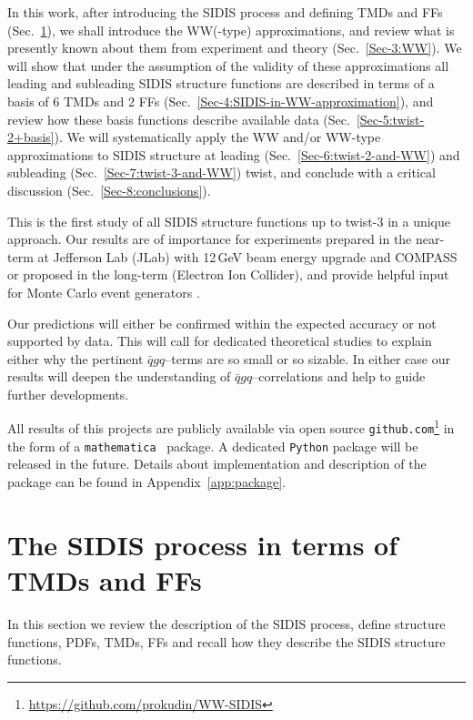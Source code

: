 \documentclass[a4paper,11pt]{article}
\newcommand{\blue}[1]{{\color{blue} #1}}
\newcommand{\ps}[1]{\blue{ #1}}
\begin{document}
In this work, after introducing the SIDIS process and defining TMDs and FFs 
(Sec.~\ref{Sec-2:SIDIS+TMDs+FF}), we shall introduce the WW(-type) 
approximations, and review what is presently known about them 
from experiment and theory (Sec.~\ref{Sec-3:WW}).
We will show that under the assumption of the validity of these approximations 
all leading and subleading SIDIS structure functions are described in terms of 
a basis of 6 TMDs and 2 FFs (Sec.~\ref{Sec-4:SIDIS-in-WW-approximation}),
and review how these basis functions describe available data 
(Sec.~\ref{Sec-5:twist-2+basis}).
We will systematically apply the WW and/or WW-type approximations
to SIDIS structure at leading (Sec.~\ref{Sec-6:twist-2-and-WW}) 
and subleading (Sec.~\ref{Sec-7:twist-3-and-WW}) twist, and
conclude with a critical discussion (Sec.~\ref{Sec-8:conclusions}).

This is the first study of all SIDIS structure functions up to twist-3 
in a unique approach. Our results are of importance for experiments prepared 
in the near-term at \ps{Jefferson Lab (JLab) with 12$\,$GeV beam energy
upgrade and COMPASS} or proposed in the long-term  
(Electron Ion Collider), and provide helpful input for Monte Carlo event
generators \cite{Avakian:2015vha}.

Our predictions will either be confirmed within the expected accuracy
\ps{or not supported by data. This will call for dedicated theoretical 
studies to explain either why the pertinent $\bar{q}gq$--terms are 
so small or so sizable. In either case our results will deepen the 
understanding of  $\bar{q}gq$--correlations and help to guide 
further developments.}

All results of this projects are publicly available via open source \texttt{github.com}\footnote{\href{https://github.com/prokudin/WW-SIDIS}{https://github.com/prokudin/WW-SIDIS}} in the form of a \texttt{mathematica}~\cite{Mathematica} package. A dedicated \texttt{Python} package will be released in the future. Details about implementation and description of the package can be found in Appendix~\ref{app:package}.

\newpage
\section{The SIDIS process in terms of TMDs and FFs}
\label{Sec-2:SIDIS+TMDs+FF}

In this section we review the description of the SIDIS process, 
define structure functions, PDFs, TMDs, FFs and recall how they
describe the SIDIS structure functions.
\end{document}
